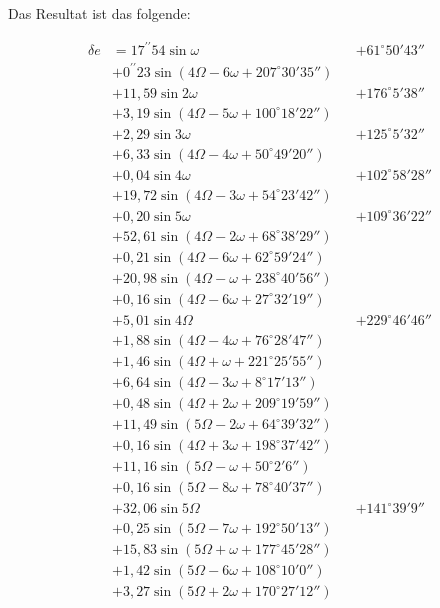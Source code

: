 \documentclass[10pt,a4paper]{article}
\begin{document}
Das Resultat ist das folgende:

\begin{align*}
\delta e &= 17^{\prime\prime}54 \sin \omega &&+ 61^{\circ}50'43'' \\
&+ 0^{\prime\prime}23 \sin(4\Omega - 6\omega + 207^{\circ}30'35'') \\
&+ 11,59 \sin 2\omega &&+ 176^{\circ}5'38'' \\
&+ 3,19 \sin(4\Omega - 5\omega + 100^{\circ}18'22'') \\
&+ 2,29 \sin 3\omega &&+ 125^{\circ}5'32'' \\
&+ 6,33 \sin(4\Omega - 4\omega + 50^{\circ}49'20'') \\
&+ 0,04 \sin 4\omega &&+ 102^{\circ}58'28'' \\
&+ 19,72 \sin(4\Omega - 3\omega + 54^{\circ}23'42'') \\
&+ 0,20 \sin 5\omega &&+ 109^{\circ}36'22'' \\
&+ 52,61 \sin(4\Omega - 2\omega + 68^{\circ}38'29'') \\
&+ 0,21 \sin(4\Omega - 6\omega + 62^{\circ}59'24'') \\
&+ 20,98 \sin(4\Omega - \omega + 238^{\circ}40'56'') \\
&+ 0,16 \sin(4\Omega - 6\omega + 27^{\circ}32'19'') \\
&+ 5,01 \sin 4\Omega &&+ 229^{\circ}46'46'' \\
&+ 1,88 \sin(4\Omega - 4\omega + 76^{\circ}28'47'') \\
&+ 1,46 \sin(4\Omega + \omega + 221^{\circ}25'55'') \\
&+ 6,64 \sin(4\Omega - 3\omega + 8^{\circ}17'13'') \\
&+ 0,48 \sin(4\Omega + 2\omega + 209^{\circ}19'59'') \\
&+ 11,49 \sin(5\Omega - 2\omega + 64^{\circ}39'32'') \\
&+ 0,16 \sin(4\Omega + 3\omega + 198^{\circ}37'42'') \\
&+ 11,16 \sin(5\Omega - \omega + 50^{\circ}2'6'') \\
&+ 0,16 \sin(5\Omega - 8\omega + 78^{\circ}40'37'') \\
&+ 32,06 \sin 5\Omega &&+ 141^{\circ}39'9'' \\
&+ 0,25 \sin(5\Omega - 7\omega + 192^{\circ}50'13'') \\
&+ 15,83 \sin(5\Omega + \omega + 177^{\circ}45'28'') \\
&+ 1,42 \sin(5\Omega - 6\omega + 108^{\circ}10'0'') \\
&+ 3,27 \sin(5\Omega + 2\omega + 170^{\circ}27'12'') \\

\end{align*}
\end{document}
